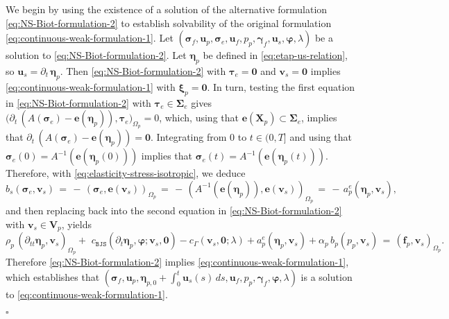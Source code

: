 \documentclass[11pt]{article}
\numberwithin{equation}{section}
\newcommand{\bgamma}{{\boldsymbol\gamma}}
\newcommand{\bbeta}{{\boldsymbol\eta}}
\newcommand{\bsi}{{\boldsymbol\sigma}}
\newcommand{\bSigma}{{\boldsymbol\Sigma}}
\newcommand{\bvarphi}{{\boldsymbol\varphi}}
\newcommand{\btau}{{\boldsymbol\tau}}
\newcommand{\bxi}{{\boldsymbol\xi}}
\newcommand{\bv}{{\mathbf{v}}}
\newcommand{\f}{\mathbf{f}}
\newcommand{\bu}{\mathbf{u}}
\newcommand{\be}{{\mathbf{e}}}
\newcommand{\0}{{\mathbf{0}}}
\def\bX{\mathbf{X}}
\def\bV{\mathbf{V}}
\def\BJS{\mathtt{BJS}}
\newenvironment{proof}{\noindent{\it Proof.}}{\hfill$\square$}
\numberwithin{equation}{section}
\begin{document}
\begin{proof}
We begin by using the existence of a solution of the alternative formulation \eqref{eq:NS-Biot-formulation-2} to establish solvability of the original formulation \eqref{eq:continuous-weak-formulation-1}.
Let $(\bsi_f, \bu_p, \bsi_e, \bu_f, p_p, \bgamma_f, \bu_s, \bvarphi, \lambda)$ be a solution to \eqref{eq:NS-Biot-formulation-2}.
Let $\bbeta_p$ be defined in \eqref{eq:etap-us-relation}, so $\bu_s = \partial_t\,\bbeta_p$.
Then \eqref{eq:NS-Biot-formulation-2} with $\btau_e = \0$ and $\bv_s = \0$ implies \eqref{eq:continuous-weak-formulation-1} with $\bxi_p = \0$.
In turn, testing the first equation in \eqref{eq:NS-Biot-formulation-2} with $\btau_e\in \bSigma_e$ gives $\big(\partial_t\,(A(\bsi_e) - \be(\bbeta_p)), \btau_e\big)_{\Omega_p} = 0$, which, using that $\be(\bX_p) \subset \bSigma_e$, implies that $\partial_t\,(A(\bsi_e) - \be(\bbeta_p)) = \0$.
Integrating from $0$ to $t\in (0,T]$ and using that $\bsi_e(0) = A^{-1}(\be(\bbeta_p(0)))$ implies that $\bsi_e(t) = A^{-1}(\be(\bbeta_p(t)))$.
Therefore, with \eqref{eq:elasticity-stress-isotropic}, we deduce
\begin{equation*}
b_s(\bsi_e,\bv_s) \,=\, -\,(\bsi_e, \be(\bv_s))_{\Omega_p} 
\,=\, -\,(A^{-1}(\be(\bbeta_p)),\be(\bv_s))_{\Omega_p} 
\,=\, -\,a^e_p(\bbeta_p, \bv_s),
\end{equation*} 
and then replacing back into the second equation in \eqref{eq:NS-Biot-formulation-2} with $\bv_s\in \bV_p$, yields
\begin{equation*}
 \rho_p\,(\partial_{tt}\bbeta_p,\bv_s)_{\Omega_p}+\,\, c_{\BJS}(\partial_{t}\bbeta_p,\bvarphi;\bv_s,\0)- c_{\Gamma}(\bv_s,\0;\lambda) +a^e_p(\bbeta_p, \bv_s) + \alpha_p\,b_p(p_p, \bv_s) \,=\, (\f_p, \bv_s)_{\Omega_p}.
\end{equation*}
Therefore \eqref{eq:NS-Biot-formulation-2} implies \eqref{eq:continuous-weak-formulation-1}, which establishes that $(\bsi_f, \bu_p, \bbeta_{p,0} + \int^t_0 \bu_s(s)\,ds, \bu_f, p_p, \bgamma_f, \bvarphi, \lambda)$ is a solution to \eqref{eq:continuous-weak-formulation-1}.


\end{proof}
\end{document}
